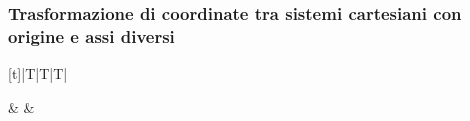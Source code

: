 \documentclass[letterpaper,10pt,italian]{jupyterBook}
\begin{document}
\subsubsection{Trasformazione di coordinate tra sistemi cartesiani con origine e assi diversi}
\label{\detokenize{ch/analytic_geometry/analytic_geometry_2d/coordinates:trasformazione-di-coordinate-tra-sistemi-cartesiani-con-origine-e-assi-diversi}}\label{\detokenize{ch/analytic_geometry/analytic_geometry_2d/coordinates:geometry-analytic-2d-coordinates-transform-cartesian}}

\begin{savenotes}\sphinxattablestart
\centering
\begin{tabulary}{\linewidth}[t]{|T|T|T|}
\hline

\sphinxAtStartPar
{}
&
\sphinxAtStartPar
{}
&
\sphinxAtStartPar
{}
\\
\hline
\end{tabulary}
\par
\sphinxattableend\end{savenotes}
\end{document}
